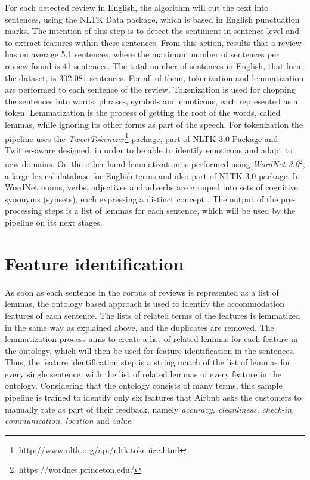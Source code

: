For each detected review in English, the algorithm will cut the text into sentences, using the NLTK Data package, which is based in English punctuation marks. The intention of this step is to detect the sentiment in sentence-level and to extract features within these sentences. From this action, results that a review has on average 5.1 sentences, where the maximum number of sentences per review found is 41 sentences. The total number of sentences in English, that form the dataset, is 302 081 sentences. For all of them, tokenization and lemmatization are performed to each sentence of the review. Tokenization is used for chopping the sentences into words, phrases, symbols and emoticons, each represented as a token. Lemmatization is the process of getting the root of the words, called lemmas, while ignoring its other forms as part of the speech. For tokenization the pipeline uses the \textit{TweetTokenizer}\footnote{http://www.nltk.org/api/nltk.tokenize.html} package, part of NLTK 3.0 Package and Twitter-aware designed, in order to be able to identify emoticons and adapt to new domains. On the other hand lemmatization is performed using \textit{WordNet 3.0}\footnote{https://wordnet.princeton.edu/}, a large lexical database for English terms and also part of NLTK 3.0 package. In WordNet nouns, verbs, adjectives and adverbs are grouped into sets of cognitive synonyms (synsets), each expressing a distinct concept \cite{miller1995wordnet}. The output of the pre-processing steps is a list of lemmas for each sentence, which will be used by the pipeline on its next stages.
%
\section{Feature identification}
As soon as each sentence in the corpus of reviews is represented as a list of lemmas, the ontology based approach is used to identify the accommodation features of each sentence.  The lists of related terms of the features is lemmatized in the same way as explained above, and the duplicates are removed. The lemmatization process aims to create a list of related lemmas for each feature in the ontology, which will then be used for feature identification in the sentences.
Thus, the feature identification step is a string match of the list of lemmas for every single sentence, with the list of related lemmas of every feature in the ontology. Considering that the ontology consists of many terms, this sample pipeline is trained to identify only six features that Airbnb asks the customers to manually rate as part of their feedback, namely \textit{accuracy, cleanliness, check-in, communication, location} and \textit{value}. 

